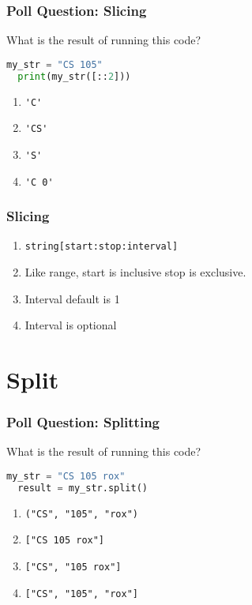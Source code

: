 \documentclass{beamer}
\begin{document}
%
%
\begin{frame}[fragile]
  \frametitle{Poll Question: Slicing}
  What is the result of running this code?
  \begin{lstlisting}[language=Python, autogobble]
  my_str = "CS 105"
  print(my_str([::2]))
  \end{lstlisting}
  \vfill
  \begin{enumerate}[A]
    \item \lstinline|'C'|
    \item \lstinline|'CS'|
    \item \lstinline|'S'|
    \item \lstinline|'C 0'|
  \end{enumerate}
\end{frame}


%
%
\begin{frame}[fragile]
  \frametitle{Slicing}
  \begin{enumerate}[A]
    \item \lstinline|string[start:stop:interval]|
    \item Like range, start is inclusive stop is exclusive.
    \item Interval default is 1
    \item Interval is optional
  \end{enumerate}
\end{frame}

\section{Split}

%
%
\begin{frame}[fragile]
  \frametitle{Poll Question: Splitting}
  What is the result of running this code?
  \begin{lstlisting}[language=Python, autogobble]
  my_str = "CS 105 rox"
  result = my_str.split()
  \end{lstlisting}
  \vfill
  \begin{enumerate}[A]
    \item \lstinline|("CS", "105", "rox")|
    \item \lstinline|["CS 105 rox"]|
    \item \lstinline|["CS", "105 rox"]|
    \item \lstinline|["CS", "105", "rox"]|
  \end{enumerate}
\end{frame}
\end{document}

